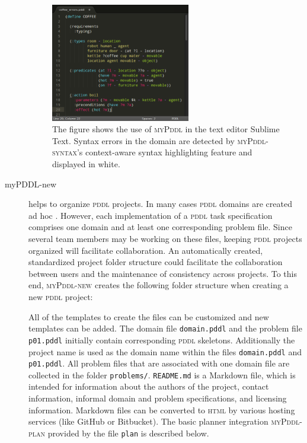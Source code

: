 \documentclass[runningheads]{llncs}
\newcommand{\mypddl}{\textsc{myPddl}\xspace}
\newcommand{\mypddlsyntax}{\textsc{myPddl-syntax}\xspace}
\newcommand{\mypddlnew}{\textsc{myPddl-new}\xspace}
\newcommand{\mypddlplan}{\textsc{myPddl-plan}\xspace}
\newcommand{\pddl}{\textsc{pddl}\xspace}
\begin{document}
\begin{description}
  \begin{figure}
    \centering
    \includegraphics[width=0.6\textwidth]{coffee-yes.pdf}
    \caption{The figure shows the use of \mypddl in the text editor
      Sublime Text. Syntax errors in the domain are detected by
      \mypddlsyntax's context-aware syntax highlighting feature and
      displayed in white.}
\label{fig:syntax}
  \end{figure}

\item[myPDDL-new] helps to organize \pddl projects. In many cases
  \pddl domains are created ad hoc \cite{shah2013exploring}. However,
  each implementation of a \pddl task specification comprises one
  domain and at least one corresponding problem file. Since several
  team members may be working on these files, keeping \pddl projects
  organized will facilitate collaboration. An automatically created,
  standardized project folder structure could facilitate the
  collaboration between users and the maintenance of consistency
  across projects. To this end, \mypddlnew creates the following
  folder structure when creating a new \pddl project:
  \begin{figure}[H]
\end{figure}
  All of the templates to create the files can be customized and new
  templates can be added. The domain file \texttt{domain.pddl} and the
  problem file \texttt{p01.pddl} initially contain corresponding \pddl
  skeletons. Additionally the project name is used as the domain name
  within the files \texttt{domain.pddl} and \texttt{p01.pddl}. All
  problem files that are associated with one domain file are collected
  in the folder \texttt{problems/}. \texttt{README.md} is a Markdown
  file, which is intended for information about the authors of the
  project, contact information, informal domain and problem
  specifications, and licensing information.  Markdown files can be
  converted to \textsc{html} by various hosting services (like GitHub
  or Bitbucket). The basic planner integration \mypddlplan provided by
  the file \texttt{plan} is described below.


\end{description}
\end{document}

